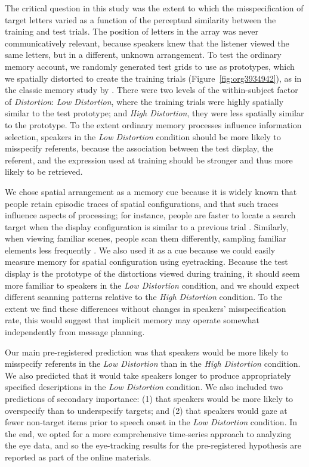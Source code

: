 \documentclass[natbib,doc,a4paper]{apa6}
\begin{document}
The critical question in this study was the extent to which the misspecification of target letters varied as a function of the perceptual similarity between the training and test trials. The position of letters in the array was never communicatively relevant, because speakers knew that the listener viewed the same letters, but in a different, unknown arrangement. To test the ordinary memory account, we randomly generated test grids to use as prototypes, which we spatially distorted to create the training trials (Figure~\ref{fig:org3934942}), as in the classic memory study by \cite{posner_keele_1968}. There were two levels of the within-subject factor of \emph{Distortion}: \emph{Low Distortion}, where the training trials were highly spatially similar to the test prototype; and \emph{High Distortion}, they were less spatially similar to the prototype. To the extent ordinary memory processes influence information selection, speakers in the \emph{Low Distortion} condition should be more likely to misspecify referents, because the association between the test display, the referent, and the expression used at training should be stronger and thus more likely to be retrieved.

We chose spatial arrangement as a memory cue because it is widely known that people retain episodic traces of spatial configurations, and that such traces influence aspects of processing; for instance, people are faster to locate a search target when the display configuration is similar to a previous trial \citep{chun_jiang_1998}.  Similarly, when viewing familiar scenes, people scan them differently, sampling familiar elements less frequently \citep{ryan2000amnesia}.  We also used it as a cue because we could easily measure memory for spatial configuration using eyetracking. Because the test display is the prototype of the distortions viewed during training, it should seem more familiar to speakers in the \emph{Low Distortion} condition, and we should expect different scanning patterns relative to the \emph{High Distortion} condition. To the extent we find these differences without changes in speakers' misspecification rate, this would suggest that implicit memory may operate somewhat independently from message planning.

Our main pre-registered prediction was that speakers would be more likely to misspecify referents in the \emph{Low Distortion} than in the \emph{High Distortion} condition. We also predicted that it would take speakers longer to produce appropriately specified descriptions in the \emph{Low Distortion} condition. We also included two predictions of secondary importance: (1) that speakers would be more likely to overspecify than to underspecify targets; and (2) that speakers would gaze at fewer non-target items prior to speech onset in the \emph{Low Distortion} condition. In the end, we opted for a more comprehensive time-series approach to analyzing the eye data, and so the eye-tracking results for the pre-registered hypothesis are reported as part of the online materials.
\end{document}

